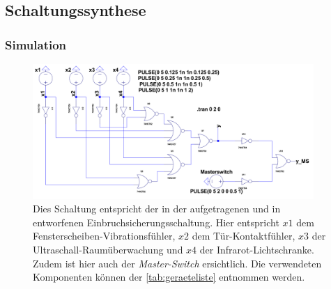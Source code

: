 \documentclass[12pt,english,ngerman]{scrartcl}
\begin{document}

\subsection{Schaltungssynthese}
\subsubsection{Simulation}


\begin{figure}[H]
  \centering
    \includegraphics[width=0.95\textwidth]{./simdaten_lab/logic/schaltung.png}
    \caption{Dies Schaltung entspricht der in der
     aufgetragenen und in
   entworfenen Einbruchsicherungsschaltung. Hier
  entspricht $x1$ dem Fensterscheiben-Vibrationsfühler, $x2$ dem
  Tür-Kontaktfühler, $x3$ der Ultraschall-Raumüberwachung und $x4$ der
  Infrarot-Lichtschranke. Zudem ist hier auch der \textit{Master-Switch}
ersichtlich. Die verwendeten Komponenten können der \autoref{tab:geraeteliste}
entnommen werden.}
  \label{fig:sim_aufbau_alarm}
\end{figure}

\end{document}

